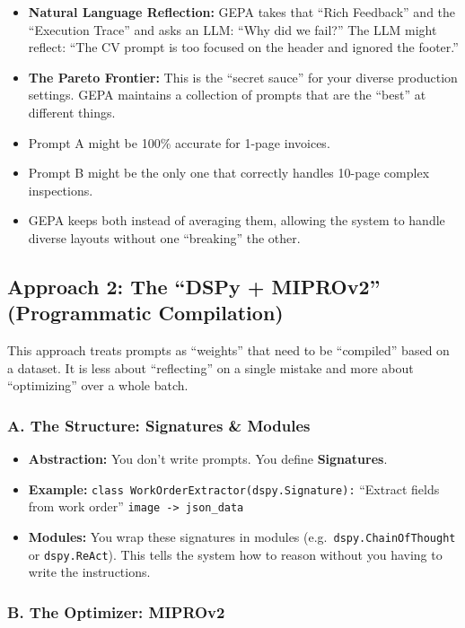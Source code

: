 \documentclass[11pt,a4paper]{article}
\begin{document}
\begin{itemize}
  \item \textbf{Natural Language Reflection:} GEPA takes that ``Rich Feedback'' and the ``Execution Trace'' and asks an LLM: ``Why did we fail?'' The LLM might reflect: ``The CV prompt is too focused on the header and ignored the footer.''
  \item \textbf{The Pareto Frontier:} This is the ``secret sauce'' for your diverse production settings. GEPA maintains a collection of prompts that are the ``best'' at different things.
  \item Prompt A might be 100\% accurate for 1-page invoices.
  \item Prompt B might be the only one that correctly handles 10-page complex inspections.
  \item GEPA keeps both instead of averaging them, allowing the system to handle diverse layouts without one ``breaking'' the other.
\end{itemize}

\subsection{Approach 2: The ``DSPy + MIPROv2'' (Programmatic Compilation)}

This approach treats prompts as ``weights'' that need to be ``compiled'' based on a dataset. It is less about ``reflecting'' on a single mistake and more about ``optimizing'' over a whole batch.

\subsubsection{A. The Structure: Signatures \& Modules}

\begin{itemize}
  \item \textbf{Abstraction:} You don't write prompts. You define \textbf{Signatures}.
  \item \textbf{Example:} \texttt{class WorkOrderExtractor(dspy.Signature):} ``Extract fields from work order'' \texttt{image -> json\_data}
  \item \textbf{Modules:} You wrap these signatures in modules (e.g.\ \texttt{dspy.ChainOfThought} or \texttt{dspy.ReAct}). This tells the system how to reason without you having to write the instructions.
\end{itemize}

\subsubsection{B. The Optimizer: MIPROv2}
\end{document}
